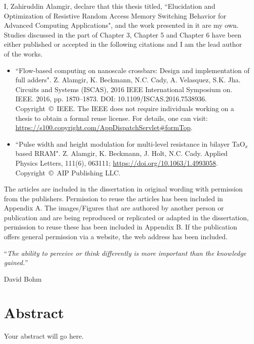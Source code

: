 \documentclass[letterpaper,12pt,openany]{report}
\begin{document}
I, Zahiruddin Alamgir, declare that this thesis titled, ``Elucidation and Optimization of Resistive Random Access Memory Switching Behavior for Advanced Computing Applications", and the work presented in it are my own. Studies discussed in the part of Chapter 3, Chapter 5 and Chapter 6 have been either published or accepted in the following citations and I am the lead author of the works.

\begin{itemize} 

\item ``Flow-based computing on nanoscale crossbars: Design and implementation of full adders". Z. Alamgir, K. Beckmann, N.C. Cady, A. Velasquez, S.K. Jha. Circuits and Systems (ISCAS), 2016 IEEE International Symposium on. IEEE. 2016, pp. 1870–1873. DOI:
10.1109/ISCAS.2016.7538936. Copyright~\copyright~IEEE. The IEEE does not require individuals working on a thesis to obtain a formal reuse license. For details, one can visit:
\url{https://s100.copyright.com/AppDispatchServlet#formTop}.


\item ``Pulse width and height modulation for multi-level resistance in bilayer TaO$_{x}$ based RRAM". Z. Alamgir, K. Beckmann, J. Holt, N.C. Cady. Applied Physics Letters, 111(6), 063111; \url{ https://doi.org/10.1063/1.4993058}. Copyright~\copyright~AIP Publishing LLC. 

\end{itemize}
The articles are included in the dissertation in original wording with permission from the publishers. Permission to reuse the articles has been included in Appendix A. The images/Figures that are authored by another person or publication and are being reproduced or replicated or adapted in the dissertation, permission to reuse these has been included in Appendix B. If the publication offers general permission via a website, the web address has been included.


 \cleardoublepage

\vspace*{0.2\textheight}

\noindent\enquote{\itshape The ability to perceive or think differently is more important than the knowledge gained.}\bigbreak

\hfill David Bohm

  \clearpage


\chapter*{\centering Abstract}
Your abstract will go here.
\end{document}
